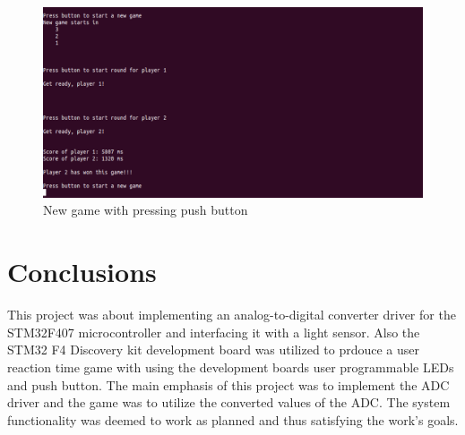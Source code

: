 \begin{figure}[htbp]
  \centering
     \includegraphics[width=1\textwidth]{./figures/Game_demo3.png}
  \caption{New game with pressing push button}
  \label{fig:second_game_run}
\end{figure}

\pagebreak


\section{Conclusions}
This project was about implementing an analog-to-digital converter driver for the STM32F407 microcontroller and interfacing it with a light sensor. Also the STM32 F4 Discovery kit development board was utilized to prdouce a user reaction time game with using the development boards user programmable LEDs and push button. The main emphasis of this project was to implement the ADC driver and the game was to utilize the converted values of the ADC. The system functionality was deemed to work as planned and thus satisfying the work's goals.